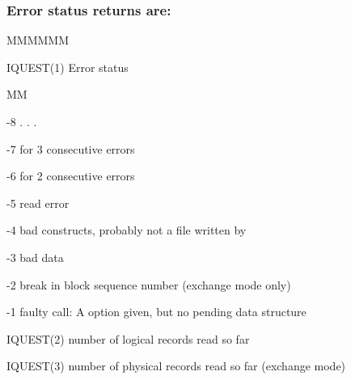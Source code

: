 \subsubsection{Error status returns are:}
\begin{DL}{MMMMMM}
\item[IQUEST(1)]Error status
\begin{DL}{MM}
\item[-8]  . . .
\item[-7]for 3 consecutive errors
\item[-6]for 2 consecutive errors
\item[-5]read error
\item[-4]bad constructs, probably not a file written by 
\item[-3]bad data
\item[-2]break in block sequence number (exchange mode only)
\item[-1]faulty call: A option given, but no pending data structure
\end{DL}
\item[IQUEST(2)]number of logical records read so far
\item[IQUEST(3)]number of physical records read so far (exchange mode)
\end{DL}
